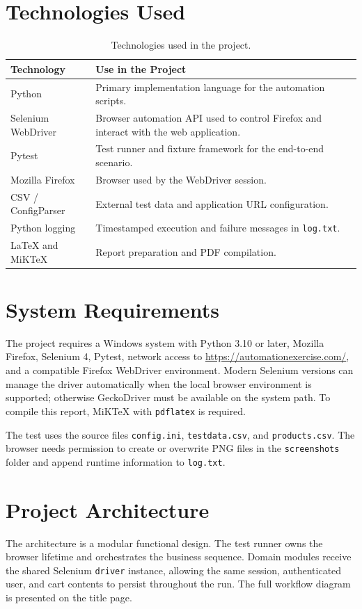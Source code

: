 \documentclass[12pt,a4paper]{article}
\begin{document}
\section{Technologies Used}
\begin{table}[H]
\centering
\begin{tabular}{p{}p{}}
\toprule
\textbf{Technology} & \textbf{Use in the Project} \\
\midrule
Python & Primary implementation language for the automation scripts. \\
Selenium WebDriver & Browser automation API used to control Firefox and interact with the web application. \\
Pytest & Test runner and fixture framework for the end-to-end scenario. \\
Mozilla Firefox & Browser used by the WebDriver session. \\
CSV / ConfigParser & External test data and application URL configuration. \\
Python logging & Timestamped execution and failure messages in \texttt{log.txt}. \\
LaTeX and MiKTeX & Report preparation and PDF compilation. \\
\bottomrule
\end{tabular}
\caption{Technologies used in the project.}
\end{table}

\section{System Requirements}
The project requires a Windows system with Python 3.10 or later, Mozilla Firefox, Selenium 4, Pytest, network access to \url{https://automationexercise.com/}, and a compatible Firefox WebDriver environment. Modern Selenium versions can manage the driver automatically when the local browser environment is supported; otherwise GeckoDriver must be available on the system path. To compile this report, MiKTeX with \texttt{pdflatex} is required.

The test uses the source files \texttt{config.ini}, \texttt{testdata.csv}, and \texttt{products.csv}. The browser needs permission to create or overwrite PNG files in the \texttt{screenshots} folder and append runtime information to \texttt{log.txt}.

\section{Project Architecture}
The architecture is a modular functional design. The test runner owns the browser lifetime and orchestrates the business sequence. Domain modules receive the shared Selenium \texttt{driver} instance, allowing the same session, authenticated user, and cart contents to persist throughout the run. The full workflow diagram is presented on the title page.
\end{document}
